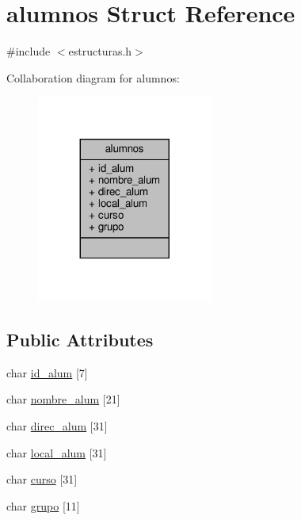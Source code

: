 \hypertarget{structalumnos}{}\section{alumnos Struct Reference}
\label{structalumnos}


{\ttfamily \#include $<$estructuras.\+h$>$}



Collaboration diagram for alumnos\+:\nopagebreak
\begin{figure}[H]
\begin{center}
\leavevmode
\includegraphics[width=164pt]{structalumnos__coll__graph}
\end{center}
\end{figure}
\subsection*{Public Attributes}
\begin{DoxyCompactItemize}
\item 
char \mbox{\hyperlink{structalumnos_a960ce04015926176477962a5c4199290}{id\+\_\+alum}} \mbox{[}7\mbox{]}
\item 
char \mbox{\hyperlink{structalumnos_a99ddf967c6149106fcdd8d74064dec00}{nombre\+\_\+alum}} \mbox{[}21\mbox{]}
\item 
char \mbox{\hyperlink{structalumnos_aa02cb94abeb6fd35003b880da9e41899}{direc\+\_\+alum}} \mbox{[}31\mbox{]}
\item 
char \mbox{\hyperlink{structalumnos_ac07a90b981cceea8fc4bf627f4126c19}{local\+\_\+alum}} \mbox{[}31\mbox{]}
\item 
char \mbox{\hyperlink{structalumnos_a5cdacbd8eecf8fe90d08936865c1ccf6}{curso}} \mbox{[}31\mbox{]}
\item 
char \mbox{\hyperlink{structalumnos_a1100c8a658fcb00dd7b0a057b1cd0c09}{grupo}} \mbox{[}11\mbox{]}
\end{DoxyCompactItemize}


